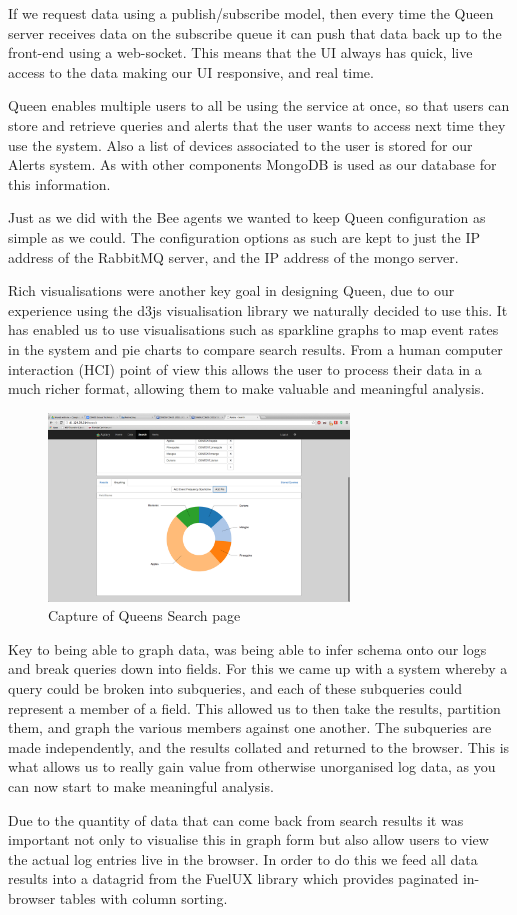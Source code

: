 If we request data using a publish/subscribe model, then every time the Queen
server receives data on the subscribe queue it can push that data back up to the
front-end using a web-socket. This means that the UI always has quick, live
access to the data making our UI responsive, and real time.

Queen enables multiple users to all be using the service at once, so that users
can store and retrieve queries and alerts that the user wants to access next
time they use the system. Also a list of devices associated to the user is
stored for our Alerts system. As with other components MongoDB is used as our
database for this information.

Just as we did with the Bee agents we wanted to keep Queen configuration as
simple as we could. The configuration options as such are kept to just the IP
address of the RabbitMQ server, and the IP address of the mongo server.

Rich visualisations were another key goal in designing Queen, due to our
experience using the d3js\cite{d3} visualisation library we naturally decided to use
this. It has enabled us to use visualisations such as sparkline graphs to map
event rates in the system and pie charts to compare search results. From a human
computer interaction (HCI) point of view this allows the user to process their
data in a much richer format, allowing them to make valuable and meaningful
analysis.

\graphicspath{{./pics/}}
\begin{figure}[h1]
  \includegraphics[width=8cm, keepaspectratio]{search.png}
  \caption{Capture of Queens Search page}
\end{figure}

Key to being able to graph data, was being able to infer schema onto our logs
and break queries down into fields. For this we came up with a system whereby a
query could be broken into subqueries, and each of these subqueries could
represent a member of a field. This allowed us to then take the results,
partition them, and graph the various members against one another. The
subqueries are made independently, and the results collated and returned to the
browser. This is what allows us to really gain value from otherwise unorganised
log data, as you can now start to make meaningful analysis.

Due to the quantity of data that can come back from search results it was
important not only to visualise this in graph form but also allow users to view
the actual log entries live in the browser. In order to do this we feed all data
results into a datagrid from the FuelUX\cite{fuelux} library which provides paginated
in-browser tables with column sorting.
